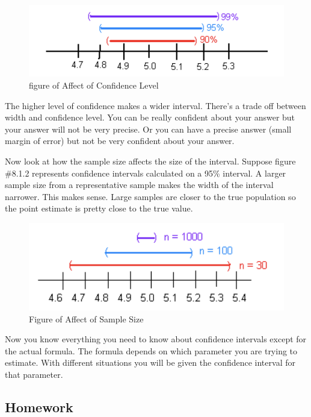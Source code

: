 \documentclass[]{book}
\begin{document}
\begin{figure}
\centering
\includegraphics{effect_confidence_level.png}
\caption{figure of Affect of Confidence Level}
\end{figure}

The higher level of confidence makes a wider interval. There's a trade off between width and confidence level. You can be really confident about your answer but your answer will not be very precise. Or you can have a precise answer (small margin of error) but not be very confident
about your answer.

Now look at how the sample size affects the size of the interval. Suppose figure \#8.1.2 represents confidence intervals calculated on a 95\% interval. A larger sample size from a representative sample makes the width of the interval narrower. This makes sense. Large samples are closer to the true population so the point estimate is pretty close to the true value.

\begin{figure}
\centering
\includegraphics{effect_sample_size.png}
\caption{Figure of Affect of Sample Size}
\end{figure}

Now you know everything you need to know about confidence intervals except for the actual formula. The formula depends on which parameter you are trying to estimate. With different situations you will be given the confidence interval for that parameter.

\hypertarget{homework-23}{%
\subsection{Homework}\label{homework-23}}
\end{document}
